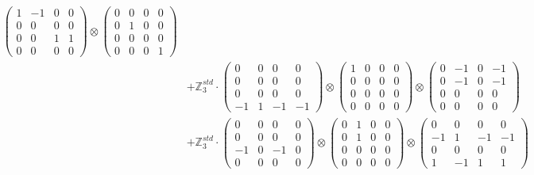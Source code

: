 \documentclass{article}
\begin{document}
{\begin{align}
            \begin{pmatrix} 1 & -1 & 0 & 0 \\ 0 & 0 & 0 & 0 \\ 0 & 0 & 1 & 1 \\ 0 & 0 & 0 & 0 \end{pmatrix} \otimes 
            \begin{pmatrix} 0 & 0 & 0 & 0 \\ 0 & 1 & 0 & 0 \\ 0 & 0 & 0 & 0 \\ 0 & 0 & 0 & 1 \end{pmatrix} \\ 
        &+ \label{Rs1-Rc16-Solution-3-c10} \mathbb{Z}_3^{std} \cdot 
            \begin{pmatrix} 0 & 0 & 0 & 0 \\ 0 & 0 & 0 & 0 \\ 0 & 0 & 0 & 0 \\ -1 & 1 & -1 & -1 \end{pmatrix} \otimes 
            \begin{pmatrix} 1 & 0 & 0 & 0 \\ 0 & 0 & 0 & 0 \\ 0 & 0 & 0 & 0 \\ 0 & 0 & 0 & 0 \end{pmatrix} \otimes 
            \begin{pmatrix} 0 & -1 & 0 & -1 \\ 0 & -1 & 0 & -1 \\ 0 & 0 & 0 & 0 \\ 0 & 0 & 0 & 0 \end{pmatrix} \\ 
        &+ \label{Rs1-Rc16-Solution-3-c11} \mathbb{Z}_3^{std} \cdot 
            \begin{pmatrix} 0 & 0 & 0 & 0 \\ 0 & 0 & 0 & 0 \\ -1 & 0 & -1 & 0 \\ 0 & 0 & 0 & 0 \end{pmatrix} \otimes 
            \begin{pmatrix} 0 & 1 & 0 & 0 \\ 0 & 1 & 0 & 0 \\ 0 & 0 & 0 & 0 \\ 0 & 0 & 0 & 0 \end{pmatrix} \otimes 
            \begin{pmatrix} 0 & 0 & 0 & 0 \\ -1 & 1 & -1 & -1 \\ 0 & 0 & 0 & 0 \\ 1 & -1 & 1 & 1 \end{pmatrix} \\ 

\end{align}}
\end{document}
